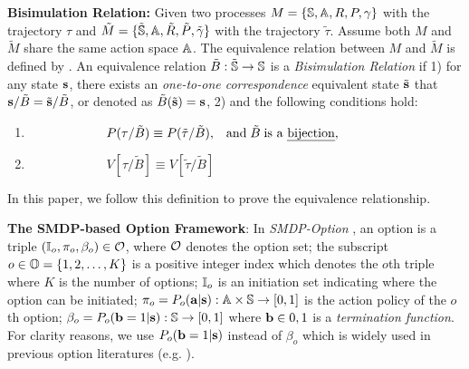 \documentclass{article}
\begin{document}
\textbf{Bisimulation Relation:} Given two processes
$M=\{{\mathbb{S}},{\mathbb{A}},R,P,\gamma\}$ with the trajectory $\tau$ and
$\tilde{M}=\{\tilde{{\mathbb{S}}},{\mathbb{A}},\tilde{R},\tilde{P},\tilde{\gamma}\}$
with the trajectory $\tilde{\tau}$. Assume both $M$ and
$\tilde{M}$ share the same action space ${\mathbb{A}}$. The equivalence
relation between $M$ and $\tilde{M}$ is defined by
. An equivalence relation
$\tilde{B}:\tilde{{\mathbb{S}}}\rightarrow{\mathbb{S}}$ is a \emph{Bisimulation
  Relation} if 1) for any state ${\mathbf{s}}$, there exists an
\emph{one-to-one correspondence} equivalent state $\tilde{{\mathbf{s}}}$
that ${\mathbf{s}}/\tilde{B}=\tilde{{\mathbf{s}}}/\tilde{B}$, or denoted as
$\tilde{B}(\tilde{{\mathbf{s}}})={\mathbf{s}}$, 2) and the following conditions
hold:
\begin{enumerate}
  \label{def:bisimulate}
\item
  $\;\;\;\;\;\;\;\;\;\;\;\;\;\;\;\;\;\;\;\;\;\;$$P(\tau/\tilde{B})\equiv
  P(\tilde{\tau}/\tilde{B}),\;\;\;
  \text{and\;}\tilde{B} \text{\;is a \emph{bijection}},$\\
\item
  $\;\;\;\;\;\;\;\;\;\;\;\;\;\;\;\;\;\;\;\;\;\;$$V[\tau/\tilde{B}]\equiv
  V[\tilde{\tau}/\tilde{B}]$
\end{enumerate}

In this paper, we follow this definition to prove the equivalence
relationship.

\textbf{The SMDP-based Option Framework}: In \emph{SMDP-Option}
\cite{sutton1999between,bacon2018temporal}, an option is a triple
$({\mathbb{I}}_o, \pi_o, \beta_o)\in {\mathcal{O}}$, where ${\mathcal{O}}$ denotes the option
set; the subscript $o\in{\mathbb{O}}=\{1,2,\dots,K\}$ is a positive
integer index which denotes the $o$th triple where $K$ is the
number of options; ${\mathbb{I}}_o$ is an initiation set indicating where
the option can be initiated;
$\pi_o=P_o({\mathbf{a}}|{\mathbf{s}}):{\mathbb{A}}\times{\mathbb{S}}\rightarrow[0,1]$ is the action
policy of the $o$th option;
$\beta_o=P_o({\mathbf{b}}=1|{\mathbf{s}}):{\mathbb{S}}\rightarrow[0,1]$ where ${\mathbf{b}}\in
{0,1}$ is a \emph{termination function}. For clarity reasons, we
use $P_o({\mathbf{b}}=1|{\mathbf{s}})$ instead of $\beta_o$ which is widely used
in previous option literatures (e.g.
\cite{sutton1999between,bacon2017option}).
\end{document}

